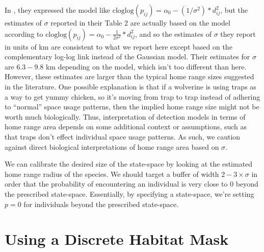 In \citet{royle_etal:2011jwm}, they expressed the model like
$\mbox{cloglog}(p_{ij}) = \alpha_{0} - (1/\sigma^2)*d_{ij}^2$, but the
estimates of $\sigma$ reported in their Table 2 are actually based on
the model according to $\mbox{cloglog}(p_{ij}) = \alpha_{0} -
\frac{1}{2\sigma^2}*d_{ij}^2$, and so the estimates of $\sigma$ they
report in units of km are consistent to what we report here except
based on the complementary log-log link instead of the Gaussian
model.
Their estimates for $\sigma$ are $6.3-9.8$ km
depending on the model,  which isn't too different than here.
However, these estimates are larger than the typical home range sizes
suggested in the literature.
One possible explanation is that
if a wolverine is using traps as a way to get yummy chicken, so it's
moving from  trap to trap instead of adhering to ``normal'' space
usage patterns, then the implied home range size might not
be worth much biologically.
Thus, interpretation of detection models in terms of
home range area depends on some additional context or assumptions,
such as that
traps don't effect individual space usage
patterns. As such, we caution against direct biological
interpretations of home range area based on $\sigma$.

We can calibrate the
desired size of the state-space by looking at the estimated home range
radius of the species. We should target a buffer of width $2-3 \times
\sigma$ in order that the probability of encountering an individual is
very close to 0 beyond the prescribed state-space. Essentially, by specifying a
state-space, we're setting $p=0$ for individuals beyond the prescribed state-space.


\section{Using a Discrete Habitat Mask}
\label{scr0.sec.discrete}


